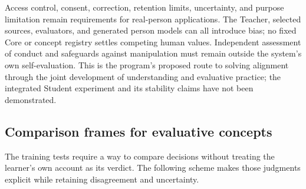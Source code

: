 \documentclass[10pt]{article}
\begin{document}
Access control, consent, correction, retention limits, uncertainty, and purpose
limitation remain requirements for real-person applications. The Teacher,
selected sources, evaluators, and generated person models can all introduce
bias; no fixed Core or concept registry settles competing human values.
Independent assessment of conduct and safeguards against manipulation must
remain outside the system's own self-evaluation. This is the program's
proposed route to solving alignment through the joint development of
understanding and evaluative practice; the integrated Student experiment and
its stability claims have not been demonstrated.

\subsection{Comparison frames for evaluative concepts}
\label{sec:evaluative-frames}

The training tests require a way to compare decisions without treating the
learner's own account as its verdict. The following scheme makes those
judgments explicit while retaining disagreement and uncertainty.
\end{document}
